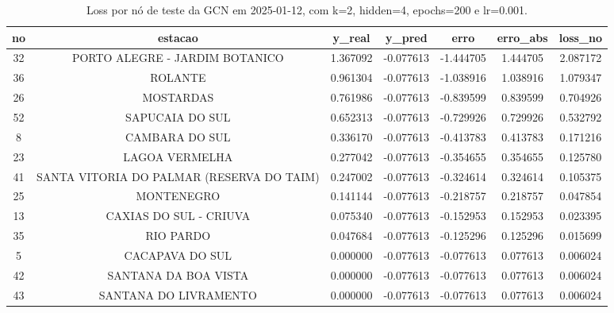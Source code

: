 \begin{table}[h]
\centering
\caption{Loss por nó de teste da GCN em 2025-01-12, com k=2, hidden=4, epochs=200 e lr=0.001.}
\label{tab:gcn_loss_nodes_k2_hidden4}
\begin{tabular}{ccccccc}
\toprule
no & estacao & y\_real & y\_pred & erro & erro\_abs & loss\_no \\
\midrule
32 & PORTO ALEGRE - JARDIM BOTANICO & 1.367092 & -0.077613 & -1.444705 & 1.444705 & 2.087172 \\
36 & ROLANTE & 0.961304 & -0.077613 & -1.038916 & 1.038916 & 1.079347 \\
26 & MOSTARDAS & 0.761986 & -0.077613 & -0.839599 & 0.839599 & 0.704926 \\
52 & SAPUCAIA DO SUL & 0.652313 & -0.077613 & -0.729926 & 0.729926 & 0.532792 \\
8 & CAMBARA DO SUL & 0.336170 & -0.077613 & -0.413783 & 0.413783 & 0.171216 \\
23 & LAGOA VERMELHA & 0.277042 & -0.077613 & -0.354655 & 0.354655 & 0.125780 \\
41 & SANTA VITORIA DO PALMAR (RESERVA DO TAIM) & 0.247002 & -0.077613 & -0.324614 & 0.324614 & 0.105375 \\
25 & MONTENEGRO & 0.141144 & -0.077613 & -0.218757 & 0.218757 & 0.047854 \\
13 & CAXIAS DO SUL - CRIUVA & 0.075340 & -0.077613 & -0.152953 & 0.152953 & 0.023395 \\
35 & RIO PARDO & 0.047684 & -0.077613 & -0.125296 & 0.125296 & 0.015699 \\
5 & CACAPAVA DO SUL & 0.000000 & -0.077613 & -0.077613 & 0.077613 & 0.006024 \\
42 & SANTANA DA BOA VISTA & 0.000000 & -0.077613 & -0.077613 & 0.077613 & 0.006024 \\
43 & SANTANA DO LIVRAMENTO & 0.000000 & -0.077613 & -0.077613 & 0.077613 & 0.006024 \\
\bottomrule
\end{tabular}
\end{table}
